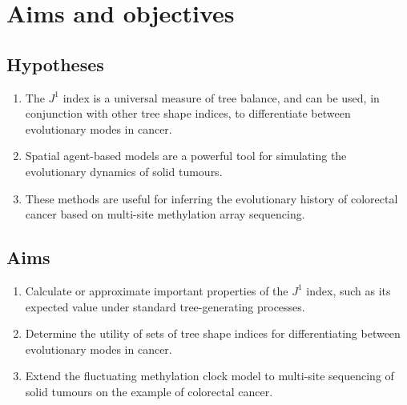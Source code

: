 \section{Aims and objectives}

\subsection{Hypotheses}
\begin{enumerate}
    \item The $J^1$ index is a universal measure of tree balance, and can be used, in conjunction with other
        tree shape indices, to differentiate between evolutionary modes in cancer.
    \item Spatial agent-based models are a powerful tool for simulating the evolutionary dynamics of solid tumours.
    \item These methods are useful for inferring the evolutionary history of colorectal cancer based on multi-site
        methylation array sequencing.
\end{enumerate}

\subsection{Aims}
\begin{enumerate}
    \item Calculate or approximate important properties of the $J^1$ index, such as its expected value under
        standard tree-generating processes.
    \item Determine the utility of sets of tree shape indices for differentiating between evolutionary modes in cancer.
    \item Extend the fluctuating methylation clock model to multi-site sequencing of solid tumours on the
        example of colorectal cancer.
\end{enumerate}

